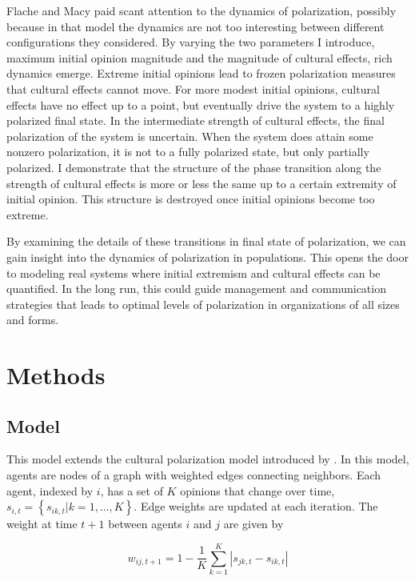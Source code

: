 \documentclass[11pt,letterpaper]{article}
\begin{document}
Flache and Macy paid scant attention to the dynamics of polarization, possibly
because in that model the dynamics are not too interesting between different
configurations they considered. By varying the two parameters I introduce,
maximum initial opinion magnitude and the magnitude of cultural effects, rich
dynamics emerge. Extreme initial opinions lead to frozen polarization measures
that cultural effects cannot move. For more modest initial opinions, cultural
effects have no effect up to a point, but eventually drive the system to 
a highly polarized final state. In the intermediate strength of cultural 
effects, the final polarization of the system is uncertain. When the system does
attain some nonzero polarization, it is not to a fully polarized state, but
only partially polarized. I demonstrate that the structure of the phase 
transition along the strength of cultural effects is more or less the same
up to a certain extremity of initial opinion. This structure is destroyed once
initial opinions become too extreme. 

By examining the details of these transitions in final state of polarization,
we can gain insight into the dynamics of polarization in populations. This
opens the door to modeling real systems where initial extremism and cultural
effects can be quantified. In the long run, this could guide management and
communication strategies that leads to optimal levels of polarization in 
organizations of all sizes and forms.

\section{Methods}
\label{sec:Methods}

\subsection{Model}
\label{sub:Model}

This model extends the cultural polarization model introduced by 
. In this model, agents are nodes of a graph with weighted
edges connecting neighbors. Each agent, indexed by $i$, has a set of $K$ opinions 
that change over time, $s_{i,t} = \left\{ s_{ik,t} | k = 1, \ldots, K\right\}$.
Edge weights are updated at each iteration. The weight
at time $t+1$ between agents $i$ and $j$ are given by 

\begin{equation}
  w_{ij,t+1} = 1 - \frac{1}{K} \sum_{k=1}^K \left| s_{jk,t} - s_{ik,t} \right|
\end{equation}
\end{document}
